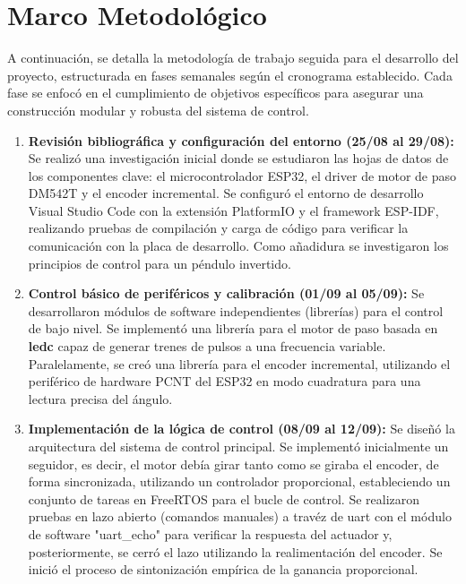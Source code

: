 \chapter{Marco Metodológico}\label{metodologia}

A continuación, se detalla la metodología de trabajo seguida para el desarrollo del proyecto, estructurada en fases semanales según el cronograma establecido. Cada fase se enfocó en el cumplimiento de objetivos específicos para asegurar una construcción modular y robusta del sistema de control.

\begin{enumerate}[label=\textbf{Semana \arabic*:}, leftmargin=*]

    \item \textbf{Revisión bibliográfica y configuración del entorno (25/08 al 29/08):}
    Se realizó una investigación inicial donde se estudiaron las hojas de datos de los componentes clave: el microcontrolador ESP32, el driver de motor de paso DM542T y el encoder incremental. Se configuró el entorno de desarrollo Visual Studio Code con la extensión PlatformIO y el framework ESP-IDF, realizando pruebas de compilación y carga de código para verificar la comunicación con la placa de desarrollo. Como añadidura se investigaron los principios de control para un péndulo invertido.

    \item \textbf{Control básico de periféricos y calibración (01/09 al 05/09):}
    Se desarrollaron módulos de software independientes (librerías) para el control de bajo nivel. Se implementó una librería para el motor de paso basada en \textbf{ledc} capaz de generar trenes de pulsos a una frecuencia variable. Paralelamente, se creó una librería para el encoder incremental, utilizando el periférico de hardware PCNT del ESP32 en modo cuadratura para una lectura precisa del ángulo.

    \item \textbf{Implementación de la lógica de control (08/09 al 12/09):}
    Se diseñó la arquitectura del sistema de control principal. Se implementó inicialmente un seguidor, es decir, el motor debía girar tanto como se giraba el encoder, de forma sincronizada, utilizando un controlador proporcional, estableciendo un conjunto de tareas en FreeRTOS para el bucle de control. Se realizaron pruebas en lazo abierto (comandos manuales) a travéz de uart con el módulo de software "uart\_echo" para verificar la respuesta del actuador y, posteriormente, se cerró el lazo utilizando la realimentación del encoder. Se inició el proceso de sintonización empírica de la ganancia proporcional.


\end{enumerate}
